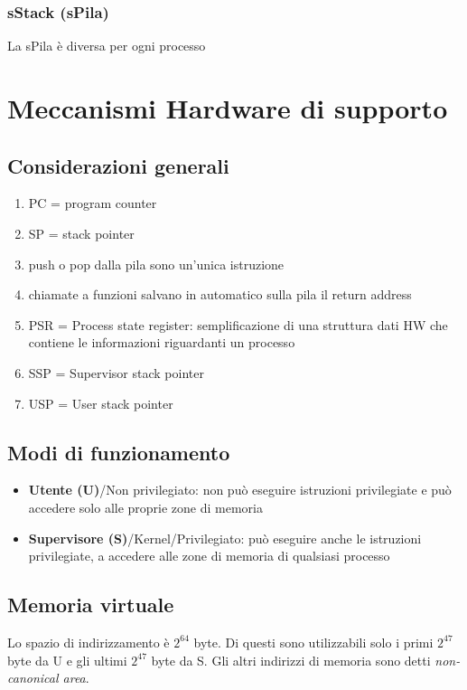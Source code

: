 \documentclass[12pt, a4paper]{report}
\begin{document}
\subsection{sStack (sPila)}
La sPila è diversa per ogni processo

\chapter{Meccanismi Hardware di supporto}

\section{Considerazioni generali}
\begin{enumerate}
	\item PC = program counter
	\item SP = stack pointer
	\item push o pop dalla pila sono un'unica istruzione
	\item chiamate a funzioni salvano in automatico sulla pila il return address
	\item PSR = Process state register: semplificazione di una struttura dati HW
		che contiene le informazioni riguardanti un processo
	\item SSP = Supervisor stack pointer
	\item USP = User stack pointer
\end{enumerate}

\section{Modi di funzionamento}
\begin{itemize}
	\item \textbf{Utente (U)}/Non privilegiato: non può eseguire istruzioni
		privilegiate e può accedere solo alle proprie zone di memoria
	\item \textbf{Supervisore (S)}/Kernel/Privilegiato: può eseguire anche le
		istruzioni privilegiate, a accedere alle zone di memoria di qualsiasi
		processo
\end{itemize}
\section{Memoria virtuale}
Lo spazio di indirizzamento è $2^{64}$ byte. Di questi sono utilizzabili solo i
primi $2^{47}$ byte da U e gli ultimi $2^{47}$ byte da S. Gli altri indirizzi di
memoria sono detti \textit{non-canonical area}.
\end{document}
